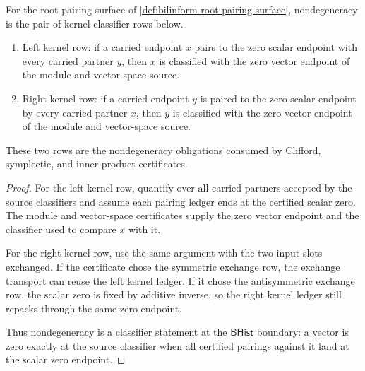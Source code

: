 \begin{theorem}
\label{thm:bilinform-root-nondegeneracy-row}
For the root pairing surface of \autoref{def:bilinform-root-pairing-surface}, nondegeneracy is the pair of kernel classifier rows below.
\begin{enumerate}
\item Left kernel row: if a carried endpoint $x$ pairs to the zero scalar endpoint with every carried partner $y$, then $x$ is classified with the zero vector endpoint of the module and vector-space source.
\item Right kernel row: if a carried endpoint $y$ is paired to the zero scalar endpoint by every carried partner $x$, then $y$ is classified with the zero vector endpoint of the module and vector-space source.
\end{enumerate}
These two rows are the nondegeneracy obligations consumed by Clifford, symplectic, and inner-product certificates.
\end{theorem}
\begin{proof}
For the left kernel row, quantify over all carried partners accepted by the source classifiers and assume each pairing ledger ends at the certified scalar zero. The module and vector-space certificates supply the zero vector endpoint and the classifier used to compare $x$ with it.

For the right kernel row, use the same argument with the two input slots exchanged. If the certificate chose the symmetric exchange row, the exchange transport can reuse the left kernel ledger. If it chose the antisymmetric exchange row, the scalar zero is fixed by additive inverse, so the right kernel ledger still repacks through the same zero endpoint.

Thus nondegeneracy is a classifier statement at the $\mathsf{BHist}$ boundary: a vector is zero exactly at the source classifier when all certified pairings against it land at the scalar zero endpoint.
\end{proof}

